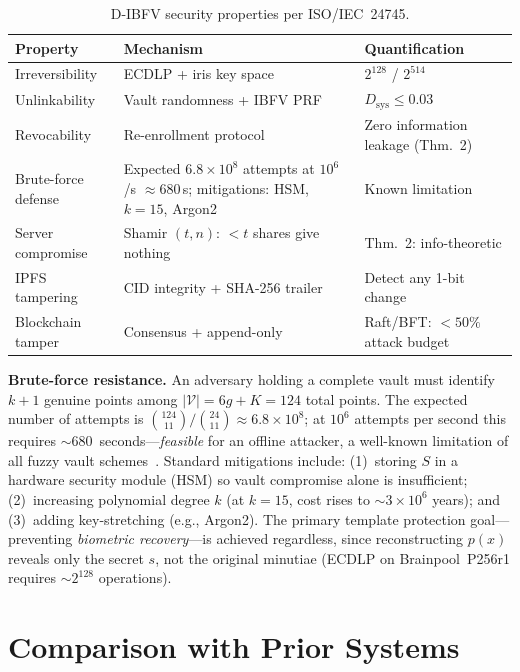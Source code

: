 \begin{table}[h]
\centering
\caption{D-IBFV security properties per ISO/IEC~24745.}
\label{tab:security_summary}
\small
\begin{tabular}{@{}p{3.2cm}p{8.2cm}p{3.8cm}@{}}
\toprule
\textbf{Property} & \textbf{Mechanism} & \textbf{Quantification} \\
\midrule
Irreversibility     & ECDLP + iris key space & $2^{128}$ / $2^{514}$ \\
Unlinkability       & Vault randomness + IBFV PRF & $D_\mathrm{sys} \leq 0.03$ \\
Revocability        & Re-enrollment protocol & Zero information leakage (Thm.~2) \\
Brute-force defense & Expected $6.8{\times}10^{8}$ attempts at $10^6$/s $\approx 680$\,s; mitigations: HSM, $k{=}15$, Argon2 & Known limitation~\cite{tams2013attacks} \\
Server compromise   & Shamir $(t,n)$: $<t$ shares give nothing & Thm.~2: info-theoretic \\
IPFS tampering      & CID integrity + SHA-256 trailer & Detect any 1-bit change \\
Blockchain tamper   & Consensus + append-only & Raft/BFT: $< 50\%$ attack budget \\
\bottomrule
\end{tabular}
\end{table}

\noindent\textbf{Brute-force resistance.} An adversary holding a complete vault
must identify $k{+}1$ genuine points among $|\mathcal{V}| = 6g + K = 124$ total
points. The expected number of attempts is
$\binom{124}{11}/\binom{24}{11} \approx 6.8 \times 10^{8}$; at $10^6$ attempts
per second this requires $\sim\!680$~seconds---\emph{feasible} for an offline
attacker, a well-known limitation of all fuzzy vault schemes~\cite{tams2013attacks}.
Standard mitigations include: (1)~storing $S$ in a hardware security module (HSM)
so vault compromise alone is insufficient; (2)~increasing polynomial degree $k$
(at $k = 15$, cost rises to $\sim\!3 \times 10^{6}$ years); and
(3)~adding key-stretching (e.g., Argon2). The primary template protection
goal---preventing \emph{biometric recovery}---is achieved regardless, since
reconstructing $p(x)$ reveals only the secret $s$, not the original minutiae
(ECDLP on Brainpool~P256r1 requires $\sim\!2^{128}$ operations).

\section{Comparison with Prior Systems}
\label{sec:prior_comparison}

